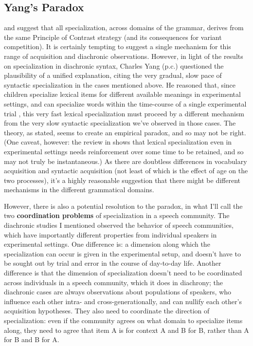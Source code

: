 \documentclass{artikel3}
\begin{document}
\subsection{Yang's Paradox}
\label{yangparadox}

\citet{wallenberg2016} and \citet{fruehwaldwallenberginprep} suggest that all specialization, across domains of the grammar, derives from the same Principle of Contrast strategy (and its consequences for variant competition). It is certainly tempting to suggest a single mechanism for this range of acquisition and diachronic observations. However, in light of the results on specialization in diachronic syntax, Charles Yang (p.c.) questioned the plausibility of a unified explanation, citing the very gradual, slow pace of syntactic specialization in the cases mentioned above. He reasoned that, since children specialize lexical items for different available meanings in experimental settings, and can specialize words within the time-course of a single experimental trial \citep[e.g. the classic study][]{markmanwachtel1988}, this very fast lexical specialization must proceed by a different mechanism from the very slow syntactic specialization we've observed in those cases. The theory, as stated, seems to create an empirical paradox, and so may not be right. (One caveat, however: the review in \citealt{bionetal2013} shows that lexical specialization even in experimental settings needs reinforcement over some time to be retained, and so may not truly be instantaneous.) As there are doubtless differences in vocabulary acquisition and syntactic acquisition (not least of which is the effect of age on the two processes), it's a highly reasonable suggestion that there might be different mechanisms in the different grammatical domains.

However, there is also a potential resolution to the paradox, in what I'll call the two \textbf{coordination problems} of specialization in a speech community. The diachronic studies I mentioned observed the behavior of speech communities, which have importantly different properties from individual speakers in experimental settings.  One difference is: a dimension along which the specialization can occur is given in the experimental setup, and doesn't have to be sought out by trial and error in the course of day-to-day life. Another difference is that the dimension of specialization doesn't need to be coordinated across individuals in a speech community, which it does in diachrony; the diachronic cases are always observations about populations of speakers, who influence each other intra- and cross-generationally, and can nullify each other's acquisition hypotheses. They also need to coordinate the direction of specialization: even if the community agrees on what domain to specialize items along, they need to agree that item A is for context A and B for B, rather than A for B and B for A. 
\end{document}
